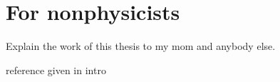 \chapter{For nonphysicists\label{ch:mom}}

Explain the work of this thesis to my mom and anybody else.

reference given in intro
